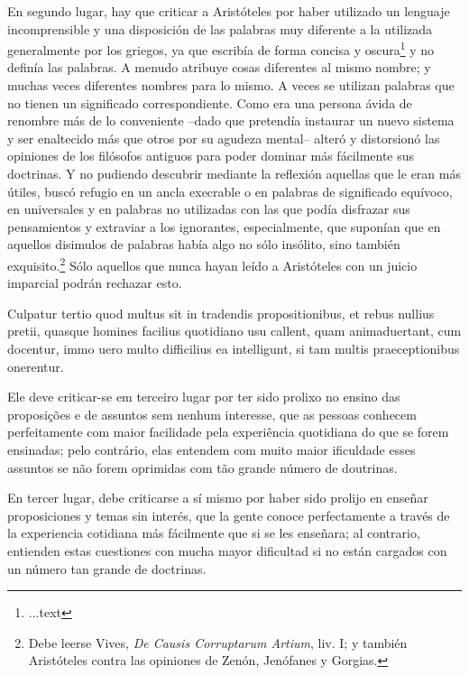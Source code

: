 \documentclass{article}
\begin{document}
\begin{paracol}{3}
\begin{nthcolumn}{1}
  \end{nthcolumn}
  \vspace{0.5cm}
  \begin{nthcolumn}{2} %
    En segundo lugar, hay que criticar a Aristóteles por haber utilizado un lenguaje incomprensible y una disposición de las palabras muy diferente a la utilizada generalmente por los griegos, ya que escribía de forma concisa y oscura\footnote[31]{...text} y no definía las palabras. A menudo atribuye cosas diferentes al mismo nombre; y muchas veces diferentes nombres para lo mismo. A veces se utilizan palabras que no tienen un significado correspondiente. Como era una persona ávida de renombre más de lo conveniente –dado que pretendía instaurar un nuevo sistema y ser enaltecido más que otros por su agudeza mental– alteró y distorsionó las opiniones de los filósofos antiguos para poder dominar más fácilmente sus doctrinas. Y no pudiendo descubrir mediante la reflexión aquellas que le eran más útiles, buscó refugio en un ancla execrable o en palabras de significado equívoco, en universales y en palabras no utilizadas con las que podía disfrazar sus pensamientos y extraviar a los ignorantes, especialmente, que suponían que en aquellos disimulos de palabras había algo no sólo insólito, sino también exquisito.\footnote[32]{Debe leerse Vives, \emph{De Causis Corruptarum Artium}, liv. I; y también Aristóteles contra las opiniones de Zenón, Jenófanes y Gorgias.} Sólo aquellos que nunca hayan leído a Aristóteles con un juicio imparcial podrán rechazar esto.
  \end{nthcolumn}
  \vspace{0.5cm}
  \begin{nthcolumn*}{0} %
    Culpatur tertio quod multus sit in tradendis propositionibus, et rebus nullius pretii, quasque homines facilius quotidiano usu callent, quam animaduertant, cum docentur, immo uero multo difficilius ea intelligunt, si tam multis praeceptionibus onerentur.
  \end{nthcolumn*}
  \vspace{0.5cm}
  \begin{nthcolumn}{1} %
    Ele deve criticar-se em terceiro lugar por ter sido prolixo no ensino das proposições e de assuntos sem nenhum interesse, que as pessoas conhecem perfeitamente com maior facilidade pela experiência quotidiana do que se forem ensinadas; pelo contrário, elas entendem com muito maior ificuldade esses assuntos se não forem oprimidas com tão grande número de doutrinas.
  \end{nthcolumn}
  \vspace{0.5cm}
  \begin{nthcolumn}{2} %
    En tercer lugar, debe criticarse a sí mismo por haber sido prolijo en enseñar proposiciones y temas sin interés, que la gente conoce perfectamente a través de la experiencia cotidiana más fácilmente que si se les enseñara; al contrario, entienden estas cuestiones con mucha mayor dificultad si no están cargados con un número tan grande de doctrinas.
  \end{nthcolumn}
\end{paracol}
\end{document}
